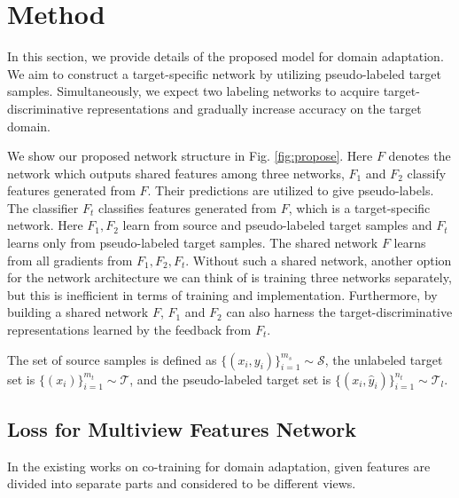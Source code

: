 \documentclass{article}
\begin{document}
\section{Method}
\vspace{-2mm}
In this section, we provide details of the proposed model for domain adaptation.
We aim to construct a target-specific network by utilizing pseudo-labeled target samples. Simultaneously, we expect two labeling networks to acquire target-discriminative representations and gradually increase accuracy on the target domain.

We show our proposed network structure in Fig. \ref{fig:propose}. Here
$F$ denotes the network which outputs shared features among three networks, $F_1$ and $F_2$ classify features generated from $F$. Their predictions are utilized to give pseudo-labels. The classifier $F_t$ classifies features generated from $F$, which is a target-specific network. Here $F_1,F_2$ learn from source and pseudo-labeled target samples and $F_t$ learns only from pseudo-labeled target samples. The shared network $F$ learns from all gradients from $F_1,F_2,F_t$. Without such a shared network, another option for the network architecture we can think of is training three networks separately, but this is inefficient in terms of training and implementation. Furthermore, by building a shared network $F$, $F_1$ and $F_2$ can also harness the target-discriminative representations learned by the feedback from $F_t$.

The set of source samples is defined as $ \bigl\{({x_i},{y_i})\bigr\}^{m_{s}}_{i=1}\sim \mathcal{S}$, the unlabeled target set is $ \bigl\{({x_i})\bigr\}^{m_{t}}_{i=1}\sim \mathcal{T}$, and the pseudo-labeled target set is $ \bigl\{({x_i},{\hat{y}_{i}})\bigr\}^{n_{t}}_{i=1}\sim \mathcal{T}_{l}$.
\vspace{-2mm}
\subsection{Loss for Multiview Features Network}
In the existing works \cite{coda} on co-training for domain adaptation, given features are divided into separate parts and considered to be different views.
\end{document}
